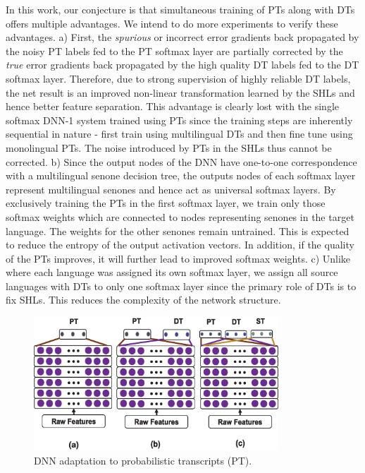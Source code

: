 \documentclass[a4paper]{article}
\newcommand{\myvspacefig}{\vspace{-4mm}}
\begin{document}
In this work, our conjecture is that simultaneous training of PTs along with DTs offers multiple advantages. We intend to do more experiments to verify these advantages. a) First, the \emph{spurious} or incorrect error gradients back propagated by the noisy PT labels fed to the PT softmax layer are partially corrected by the \emph{true} error gradients back propagated by the high quality DT labels fed to the DT softmax layer. Therefore, due to strong supervision of highly reliable DT labels, the net result is an improved non-linear transformation learned by the SHLs and hence better feature separation. This advantage is clearly lost with the single softmax DNN-1 system trained using PTs since the training steps are inherently sequential in nature - first train using multilingual DTs and then fine tune using monolingual PTs. The noise introduced by PTs in the SHLs thus cannot be corrected. b) Since the output nodes of the DNN have one-to-one correspondence with a multilingual senone decision tree, the outputs nodes of each softmax layer represent multilingual senones and hence act as universal softmax layers. By exclusively training the PTs in the first softmax layer, we train only those softmax weights which are connected to nodes representing senones in the target language. The weights for the other senones remain untrained. This is expected to reduce the entropy of the output activation vectors. In addition, if the quality of the PTs improves, it will further lead to improved softmax weights. c) Unlike \cite{Scanzio-MultisoftmaxFirstPaper} where each language was assigned its own softmax layer, we assign all source languages with DTs to only one softmax layer since the primary role of DTs is to fix SHLs. This reduces the complexity of the network structure. 

\begin{figure}
 \centering
 \includegraphics[width=\linewidth,height=5cm,keepaspectratio]{fig/DNN_multisoftmax.eps} 
 \caption{DNN adaptation to probabilistic transcripts (PT).}
 \myvspacefig
 \label{fig:DNN}
\end{figure}
\end{document}
